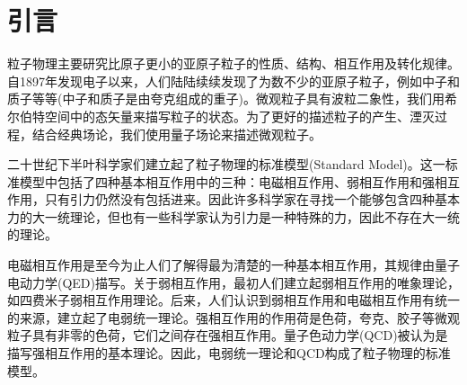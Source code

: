 \chapter{引言}
\label{chap01}
粒子物理主要研究比原子更小的亚原子粒子的性质、结构、相互作用及转化规律。自1897年发现电子以来，人们陆陆续续发现了为数不少的亚原子粒子，例如中子和质子等等(中子和质子是由夸克组成的重子)。微观粒子具有波粒二象性，我们用希尔伯特空间中的态矢量来描写粒子的状态。为了更好的描述粒子的产生、湮灭过程，结合经典场论，我们使用量子场论来描述微观粒子\cite{braibant2011particles}。\par
二十世纪下半叶科学家们建立起了粒子物理的标准模型(Standard Model)。这一标准模型中包括了四种基本相互作用中的三种：电磁相互作用、弱相互作用和强相互作用，只有引力仍然没有包括进来。因此许多科学家在寻找一个能够包含四种基本力的大一统理论，但也有一些科学家认为引力是一种特殊的力，因此不存在大一统的理论。\par
电磁相互作用是至今为止人们了解得最为清楚的一种基本相互作用，其规律由量子电动力学(QED)描写。关于弱相互作用，最初人们建立起弱相互作用的唯象理论，如四费米子弱相互作用理论。后来，人们认识到弱相互作用和电磁相互作用有统一的来源，建立起了电弱统一理论。强相互作用的作用荷是色荷，夸克、胶子等微观粒子具有非零的色荷，它们之间存在强相互作用。量子色动力学(QCD)被认为是描写强相互作用的基本理论。因此，电弱统一理论和QCD构成了粒子物理的标准模型。
